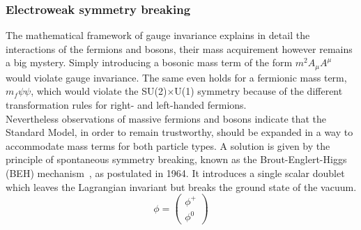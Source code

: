 \subsubsection{Electroweak symmetry breaking} \label{sec::EWSB}
The mathematical framework of gauge invariance explains in detail the interactions of the fermions and bosons, their mass acquirement however remains a big mystery. Simply introducing a bosonic mass term of the form $m^{2} A_{\mu}A^{\mu}$ would violate gauge invariance.
The same even holds for a fermionic mass term, $m_{f} \psi \psi$, which would violate the SU(2)$\times$U(1) symmetry because of the different transformation rules for right- and left-handed fermions.
\\
Nevertheless observations of massive fermions and bosons indicate that the Standard Model, in order to remain trustworthy, should be expanded in a way to accommodate mass terms for both particle types.
A solution is given by the principle of spontaneous symmetry breaking, known as the Brout-Englert-Higgs (BEH) mechanism~\cite{Englert, Higgs, Kibble}, as postulated in 1964.
It introduces a single scalar doublet which leaves the Lagrangian invariant but breaks the ground state of the vacuum.
\begin{equation}
 \phi = \begin{pmatrix}
            \phi^{+} \\
            \phi^{0}
           \end{pmatrix}
\end{equation}
